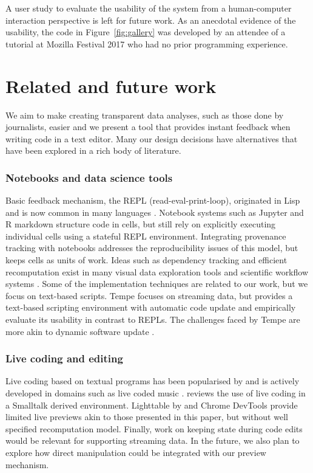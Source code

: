 \documentclass[english,submission]{programming}
\theoremstyle{plain}
\theoremstyle{definition}
\begin{document}
\noindent
A user study to evaluate the usability of the system from a human-computer interaction perspective
is left for future work. As an anecdotal evidence of the usability, the code in
Figure~\ref{fig:gallery} was developed by an attendee of a tutorial at Mozilla Festival 2017
who had no prior programming experience.


\section{Related and future work}
\label{sec:future}

We aim to make creating transparent data analyses, such as those done by journalists, easier and we
present a tool that provides instant feedback when writing code in a text editor. Many our
design decisions have alternatives that have been explored in a rich body of literature.

\subsubsection{Notebooks and data science tools}
Basic feedback mechanism, the REPL (read-eval-print-loop), originated in Lisp
\cite{lisp} and is now common in many languages \cite{drscheme}. Notebook systems
such as Jupyter and R markdown \cite{rmarkdown,jupyter,ipython} structure code in cells,
but still rely on explicitly executing individual cells using a stateful REPL environment.
Integrating provenance tracking with notebooks \cite{dataflow,noworkflow,wrattler} addresses
the reproducibility issues of this model, but keeps cells as units of work. Ideas such as
dependency tracking and efficient recomputation exist in many visual data exploration tools
\cite{control,tableau,vizdom} and scientific workflow systems \cite{taverna,kepler}. Some of the
implementation techniques are related to our work, but we focus on text-based scripts.
Tempe \cite{tempe} focuses on streaming data, but provides a text-based scripting environment
with automatic code update and \cite{ripple} empirically evaluate its usability in contrast to
REPLs. The challenges faced by Tempe are more akin to dynamic software update \cite{dsu}.

\subsubsection{Live coding and editing}
Live coding based on textual programs has been popularised by \cite{principle,learnable} and
is actively developed in domains such as live coded music \cite{beyond,sonic}. \cite{liveroad}
reviews the use of live coding in a Smalltalk derived environment. Lighttable by \cite{lighttable}
and Chrome DevTools provide limited live previews akin to those presented in this paper,
but without well specified recomputation model. Finally, work on keeping state during
code edits \cite{alive,livingit} would be relevant for supporting streaming data. In the future,
we also plan to explore how direct manipulation \cite{direct} could be integrated with our preview
mechanism. \cite{liveroad}
\end{document}
